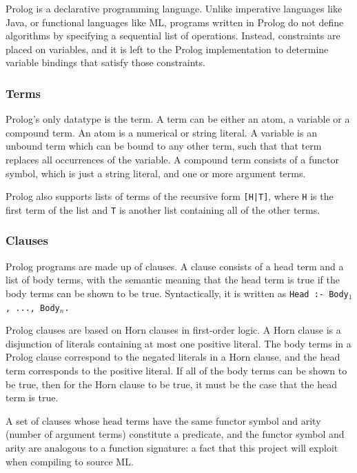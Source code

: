 \documentclass[12pt]{article}
\begin{document}
Prolog is a declarative programming language. 
Unlike imperative languages like Java, or functional languages like ML, programs written in Prolog do not define algorithms by specifying a sequential list of operations. 
Instead, constraints are placed on variables, and it is left to the Prolog implementation to determine variable bindings that satisfy those constraints. 

\subsubsection{Terms}

Prolog's only datatype is the term. 
A term can be either an atom, a variable or a compound term. 
An atom is a numerical or string literal. 
A variable is an unbound term which can be bound to any other term, such that that term replaces all occurrences of the variable. 
A compound term consists of a functor symbol, which is just a string literal, and one or more argument terms.

Prolog also supports lists of terms of the recursive form \verb/[H|T]/, where \verb|H| is the first term of the list and \verb|T| is another list containing all of the other terms.

\subsubsection{Clauses}

Prolog programs are made up of clauses. 
A clause consists of a head term and a list of body terms, with the semantic meaning that the head term is true if the body terms can be shown to be true. 
Syntactically, it is written as \verb|Head :- Body|$_1$\verb|, ..., Body|$_n$\verb|.|

Prolog clauses are based on Horn clauses in first-order logic. 
A Horn clause is a disjunction of literals containing at most one positive literal. 
The body terms in a Prolog clause correspond to the negated literals in a Horn clause, and the head term corresponds to the positive literal. 
If all of the body terms can be shown to be true, then for the Horn clause to be true, it must be the case that the head term is true. 

A set of clauses whose head terms have the same functor symbol and arity (number of argument terms) constitute a predicate, and the functor symbol and arity are analogous to a function signature: a fact that this project will exploit when compiling to source ML.
\end{document}
